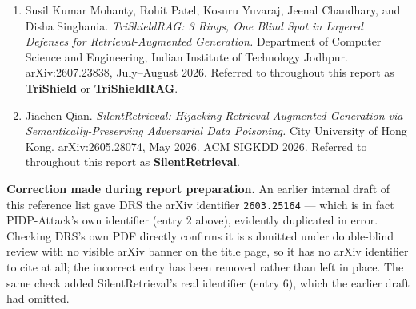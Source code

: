 \begin{enumerate}[leftmargin=2.2em,itemsep=0.5em]
\item Susil Kumar Mohanty, Rohit Patel, Kosuru Yuvaraj, Jeenal Chaudhary,
  and Disha Singhania. \emph{TriShieldRAG: 3 Rings, One Blind Spot in
  Layered Defenses for Retrieval-Augmented Generation.} Department of
  Computer Science and Engineering, Indian Institute of Technology
  Jodhpur. arXiv:2607.23838, July--August 2026. Referred to throughout this
  report as \textbf{TriShield} or \textbf{TriShieldRAG}.

\item Jiachen Qian. \emph{SilentRetrieval: Hijacking Retrieval-Augmented
  Generation via Semantically-Preserving Adversarial Data Poisoning.} City
  University of Hong Kong. arXiv:2605.28074, May 2026. ACM SIGKDD 2026.
  Referred to throughout this report as \textbf{SilentRetrieval}.

\end{enumerate}

\textbf{Correction made during report preparation.} An earlier internal
draft of this reference list gave DRS the arXiv identifier
\texttt{2603.25164} --- which is in fact PIDP-Attack's own identifier
(entry 2 above), evidently duplicated in error. Checking DRS's own PDF
directly confirms it is submitted under double-blind review with no visible
arXiv banner on the title page, so it has no arXiv identifier to cite at
all; the incorrect entry has been removed rather than left in place. The
same check added SilentRetrieval's real identifier (entry 6), which the
earlier draft had omitted.
